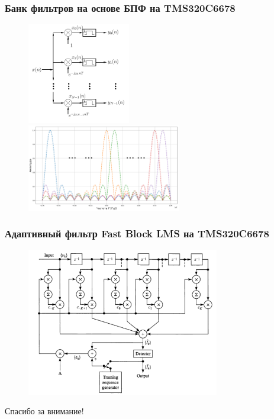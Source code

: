 \documentclass{beamer}
\begin{document}
    \begin{frame}
        \frametitle{Банк фильтров на основе БПФ на TMS320C6678}
        \begin{figure}[!tbp]
           \centering
           \includegraphics[width=0.4\textwidth]{pics/FB.png}
           \includegraphics[height=0.55\paperheight, width=0.6\textwidth]{pics/band.png}
           \captionsetup{justification=centering}
       \end{figure}
    \end{frame}
    \begin{frame}
        \frametitle{Адаптивный фильтр Fast Block LMS на TMS320C6678}
        \begin{figure}[!tbp]
           \centering
           \includegraphics[width=0.75\textwidth]{pics/NLMS.png}
           \captionsetup{justification=centering}
       \end{figure}
    \end{frame}
    \begin{frame}
        \begin{center}
        \baselineskip 20.0mm
        \Huge Спасибо за внимание!
        \end{center}
    \end{frame}
\end{document}
